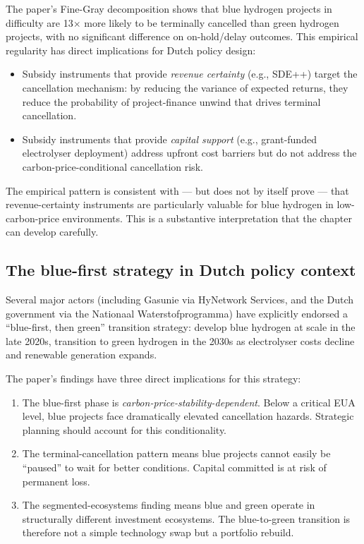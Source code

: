 \documentclass[11pt,a4paper]{article}
\begin{document}
The paper's Fine-Gray decomposition shows that blue hydrogen projects in difficulty are 13$\times$ more likely to be terminally cancelled than green hydrogen projects, with no significant difference on on-hold/delay outcomes. This empirical regularity has direct implications for Dutch policy design:

\begin{itemize}
  \item Subsidy instruments that provide \emph{revenue certainty} (e.g., SDE++) target the cancellation mechanism: by reducing the variance of expected returns, they reduce the probability of project-finance unwind that drives terminal cancellation.
  \item Subsidy instruments that provide \emph{capital support} (e.g., grant-funded electrolyser deployment) address upfront cost barriers but do not address the carbon-price-conditional cancellation risk.
\end{itemize}

The empirical pattern is consistent with --- but does not by itself prove --- that revenue-certainty instruments are particularly valuable for blue hydrogen in low-carbon-price environments. This is a substantive interpretation that the chapter can develop carefully.

\subsection{The blue-first strategy in Dutch policy context}

Several major actors (including Gasunie via HyNetwork Services, and the Dutch government via the Nationaal Waterstofprogramma) have explicitly endorsed a ``blue-first, then green'' transition strategy: develop blue hydrogen at scale in the late 2020s, transition to green hydrogen in the 2030s as electrolyser costs decline and renewable generation expands.

The paper's findings have three direct implications for this strategy:

\begin{enumerate}
  \item The blue-first phase is \emph{carbon-price-stability-dependent}. Below a critical EUA level, blue projects face dramatically elevated cancellation hazards. Strategic planning should account for this conditionality.
  \item The terminal-cancellation pattern means blue projects cannot easily be ``paused'' to wait for better conditions. Capital committed is at risk of permanent loss.
  \item The segmented-ecosystems finding means blue and green operate in structurally different investment ecosystems. The blue-to-green transition is therefore not a simple technology swap but a portfolio rebuild.
\end{enumerate}
\end{document}
